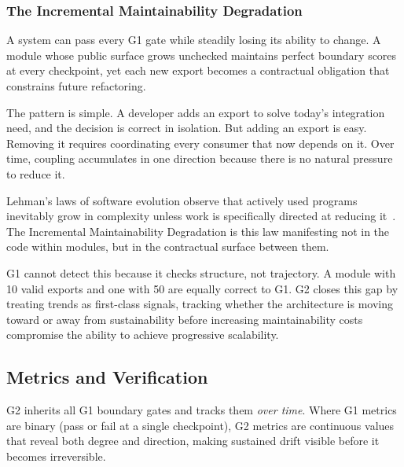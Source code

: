 \subsubsection*{The Incremental Maintainability Degradation}

\noindent
A system can pass every G1 gate while steadily losing its ability to change. A module whose public surface grows unchecked maintains perfect boundary scores at every checkpoint, yet each new export becomes a contractual obligation that constrains future refactoring.

The pattern is simple. A developer adds an export to solve today's integration need, and the decision is correct in isolation. But adding an export is easy. Removing it requires coordinating every consumer that now depends on it. Over time, coupling accumulates in one direction because there is no natural pressure to reduce it.

Lehman's laws of software evolution observe that actively used programs inevitably grow in complexity unless work is specifically directed at reducing it~\cite{lehman1980programs}. The Incremental Maintainability Degradation is this law manifesting not in the code within modules, but in the contractual surface between them.

G1 cannot detect this because it checks structure, not trajectory. A module with 10 valid exports and one with 50 are equally correct to G1. G2 closes this gap by treating trends as first-class signals, tracking whether the architecture is moving toward or away from sustainability before increasing maintainability costs compromise the ability to achieve progressive scalability.

\subsection*{Metrics and Verification}

G2 inherits all G1 boundary gates and tracks them \emph{over time}. Where G1 metrics are binary (pass or fail at a single checkpoint), G2 metrics are continuous values that reveal both degree and direction, making sustained drift visible before it becomes irreversible.

